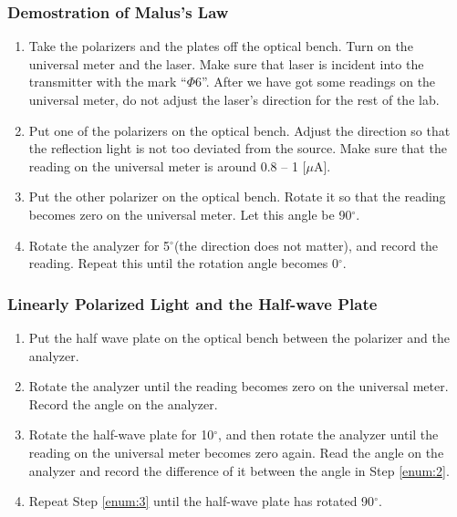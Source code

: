 \documentclass{my_template}
\begin{document}
    \subsubsection{Demostration of Malus's Law}
    \begin{enumerate}
        \item Take the polarizers and the plates off the optical bench. Turn on the universal meter and the laser. Make sure that laser is incident into the transmitter with the mark ``$\Phi 6$''. After we have got some readings on the universal meter, do not adjust the laser's direction for the rest of the lab.
        \item Put one of the polarizers on the optical bench. Adjust the direction so that the reflection light is not too deviated from the source. Make sure that the reading on the universal meter is around 0.8 -- 1 [$\mu$A].
        \item Put the other polarizer on the optical bench. Rotate it so that the reading becomes zero on the universal meter. Let this angle be 90$^\circ$.
        \item Rotate the analyzer for 5$^\circ$(the direction does not matter), and record the reading. Repeat this until the rotation angle becomes 0$^\circ$.
    \end{enumerate}
    \subsubsection{Linearly Polarized Light and the Half-wave Plate}
    \begin{enumerate}
        \item Put the half wave plate on the optical bench between the polarizer and the analyzer.
        \item Rotate the analyzer until the reading becomes zero on the universal meter. Record the angle on the analyzer.\label{enum:2}
        \item Rotate the half-wave plate for 10$^\circ$, and then rotate the analyzer until the reading on the universal meter becomes zero again. Read the angle on the analyzer and record the difference of it between the angle in Step \ref{enum:2}. \label{enum:3}
        \item  Repeat Step \ref{enum:3} until the half-wave plate has rotated 90$^\circ$.
    \end{enumerate}
\end{document}
